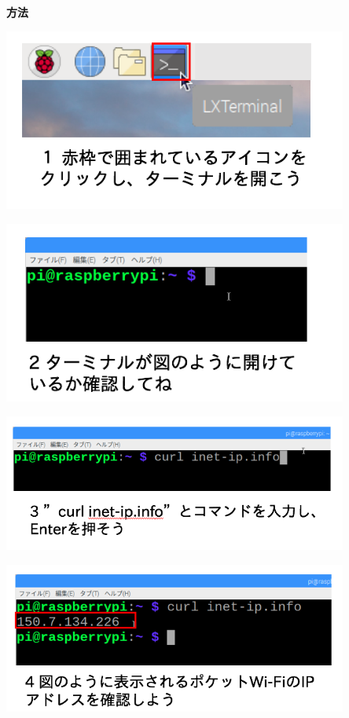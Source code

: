 \documentclass[a4paper,12pt,dvipdfmx]{jarticle}
\begin{document}
\bigskip

{\bfseries
	方法}



\centering
\includegraphics[width=0.85\textwidth]{ome7-img007.png}

\centering
\includegraphics[width=0.85\textwidth]{ome7-img008.png}
\flushleft


\bigskip


\bigskip


\bigskip


\bigskip



\centering
\includegraphics[width=0.85\textwidth]{ome7-img018.png}

\centering
\includegraphics[width=0.85\textwidth]{ome7-img019.png}
\flushleft
\end{document}
